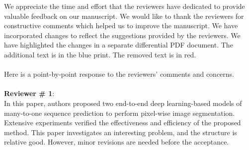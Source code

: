 \documentclass[11pt,a2paper]{report}
\begin{document}
	
	\noindent We appreciate the time and effort that the reviewers have dedicated to provide valuable feedback on our manuscript. 
	We would like to thank the reviewers for constructive comments which helped us to improve the manuscript. 
	We have incorporated changes to reflect the suggestions provided by the reviewers. 
	We have highlighted the changes in a separate differential PDF document. The additional text is in the blue print. 
	The removed text is in red. \\ \\
	Here is a point-by-point response to the reviewers’ comments and concerns.
	\\ \\
	\textbf{Reviewer \# 1}: \\
	In this paper, authors proposed two end-to-end deep learning-based models 
	of many-to-one sequence prediction to perform pixel-wise image 
	segmentation. Extensive experiments verified the effectiveness and 
	efficiency of the proposed method. This paper investigates an interesting 
	problem, and the structure is relative good. However, minor revisions are 
	needed before the acceptance.
	
\end{document}
